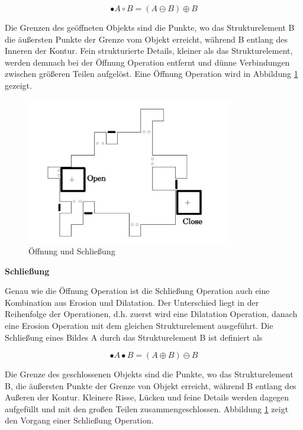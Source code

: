 \begin{equation}
•A \circ B =( A \ominus B )\oplus B  
\end{equation}

Die Grenzen des geöffneten Objekts sind die Punkte, wo das Strukturelement B die äußersten Punkte der Grenze vom Objekt erreicht, während B entlang des Inneren der Kontur. Fein strukturierte Details, kleiner als das Strukturelement, werden demnach bei der Öffnung Operation entfernt und dünne Verbindungen zwischen größeren Teilen aufgelöst. Eine Öffnung Operation wird in Abbildung \ref{fig:oeffnungundschliessung} gezeigt.

\begin{figure}[H]
 \centering 
  \includegraphics[keepaspectratio,width=0.8\textwidth]{images/4_ZweiteErfahrung/Morphological/oeffnungundschliessung.pdf}
 \caption{Öffnung und Schließung}
 \label{fig:oeffnungundschliessung}
\end{figure} 

\textbf{Schließung}

Genau wie die Öffnung Operation ist die Schließung Operation auch eine Kombination aus Erosion und Dilatation. Der Unterschied liegt in der Reihenfolge der Operationen, d.h. zuerst wird eine Dilatation Operation, danach eine Erosion Operation mit dem gleichen Strukturelement ausgeführt. Die Schließung eines Bildes A durch das Strukturelement B ist definiert als

\begin{equation}
•A \bullet B =( A \oplus B )\ominus B  
\end{equation}

Die Grenze des geschlossenen Objekts sind die Punkte, wo das Strukturelement B, die äußersten Punkte der Grenze von Objekt erreicht, während B entlang des Außeren der Kontur. Kleinere Risse, Lücken und feine Details werden dagegen aufgefüllt und mit den großen Teilen zusammengeschlossen. Abbildung \ref{fig:oeffnungundschliessung} zeigt den Vorgang einer Schließung Operation.


